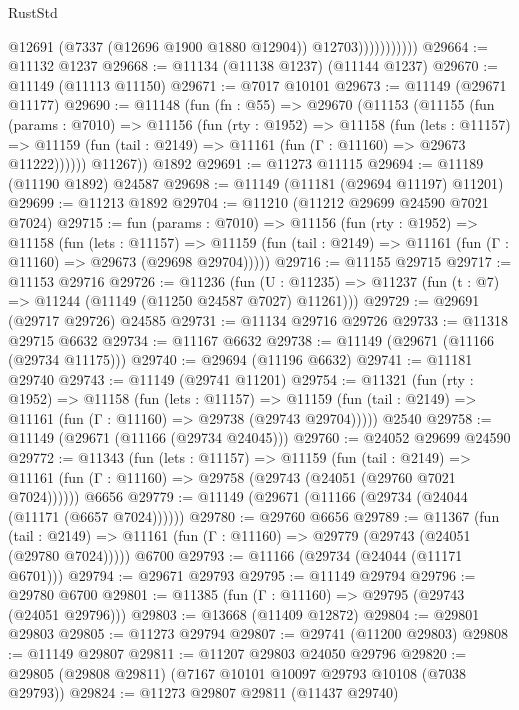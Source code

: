 \begin{lexlean}{RustStd}
\begin{coremodule}
                          @12691
                          (@7337 (@12696 @1900 @1880 @12904))
                          @12703)))))))))))
@29664 := @11132 @1237
@29668 := @11134 (@11138 @1237) (@11144 @1237)
@29670 := @11149 (@11113 @11150)
@29671 := @7017 @10101
@29673 := @11149 (@29671 @11177)
@29690 := @11148
    (fun (fn : @55) =>
    @29670
      (@11153
        (@11155
          (fun (params : @7010) =>
          @11156
            (fun (rty : @1952) =>
            @11158
              (fun (lets : @11157) =>
              @11159 (fun (tail : @2149) => @11161 (fun (Γ : @11160) => @29673 @11222))))))
        @11267))
    @1892
@29691 := @11273 @11115
@29694 := @11189 (@11190 @1892) @24587
@29698 := @11149 (@11181 (@29694 @11197) @11201)
@29699 := @11213 @1892
@29704 := @11210 (@11212 @29699 @24590 @7021 @7024)
@29715 := fun (params : @7010) =>
  @11156
    (fun (rty : @1952) =>
    @11158
      (fun (lets : @11157) =>
      @11159 (fun (tail : @2149) => @11161 (fun (Γ : @11160) => @29673 (@29698 @29704)))))
@29716 := @11155 @29715
@29717 := @11153 @29716
@29726 := @11236
    (fun (U : @11235) => @11237 (fun (t : @7) => @11244 (@11149 (@11250 @24587 @7027) @11261)))
@29729 := @29691 (@29717 @29726) @24585
@29731 := @11134 @29716 @29726
@29733 := @11318 @29715 @6632
@29734 := @11167 @6632
@29738 := @11149 (@29671 (@11166 (@29734 @11175)))
@29740 := @29694 (@11196 @6632)
@29741 := @11181 @29740
@29743 := @11149 (@29741 @11201)
@29754 := @11321
    (fun (rty : @1952) =>
    @11158
      (fun (lets : @11157) =>
      @11159 (fun (tail : @2149) => @11161 (fun (Γ : @11160) => @29738 (@29743 @29704)))))
    @2540
@29758 := @11149 (@29671 (@11166 (@29734 @24045)))
@29760 := @24052 @29699 @24590
@29772 := @11343
    (fun (lets : @11157) =>
    @11159
      (fun (tail : @2149) =>
      @11161 (fun (Γ : @11160) => @29758 (@29743 (@24051 (@29760 @7021 @7024))))))
    @6656
@29779 := @11149 (@29671 (@11166 (@29734 (@24044 (@11171 (@6657 @7024))))))
@29780 := @29760 @6656
@29789 := @11367
    (fun (tail : @2149) => @11161 (fun (Γ : @11160) => @29779 (@29743 (@24051 (@29780 @7024)))))
    @6700
@29793 := @11166 (@29734 (@24044 (@11171 @6701)))
@29794 := @29671 @29793
@29795 := @11149 @29794
@29796 := @29780 @6700
@29801 := @11385 (fun (Γ : @11160) => @29795 (@29743 (@24051 @29796)))
@29803 := @13668 (@11409 @12872)
@29804 := @29801 @29803
@29805 := @11273 @29794
@29807 := @29741 (@11200 @29803)
@29808 := @11149 @29807
@29811 := @11207 @29803 @24050 @29796
@29820 := @29805 (@29808 @29811) (@7167 @10101 @10097 @29793 @10108 (@7038 @29793))
@29824 := @11273 @29807 @29811 (@11437 @29740)

\end{coremodule}
\end{lexlean}
